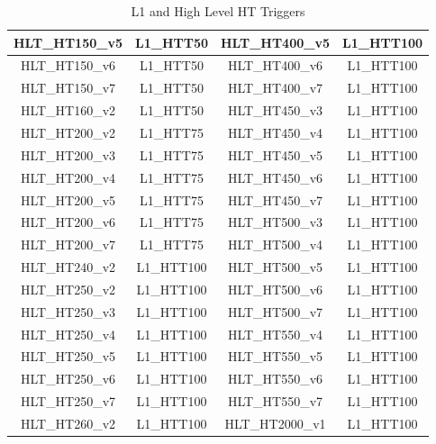 \begin{table}[th]
\begin{tabular}{|c|c||c|c|}
    \hline
    HLT\_HT150\_v5   & L1\_HTT50         & HLT\_HT400\_v5  & L1\_HTT100      \\
    \hline
    HLT\_HT150\_v6   & L1\_HTT50         & HLT\_HT400\_v6  & L1\_HTT100      \\
    \hline
    HLT\_HT150\_v7   & L1\_HTT50         & HLT\_HT400\_v7  & L1\_HTT100      \\
    \hline
    HLT\_HT160\_v2   & L1\_HTT50         & HLT\_HT450\_v3  & L1\_HTT100      \\
    \hline
    HLT\_HT200\_v2   & L1\_HTT75         & HLT\_HT450\_v4  & L1\_HTT100      \\
    \hline
    HLT\_HT200\_v3   & L1\_HTT75         & HLT\_HT450\_v5  & L1\_HTT100      \\
    \hline
    HLT\_HT200\_v4   & L1\_HTT75         & HLT\_HT450\_v6  & L1\_HTT100      \\
    \hline
    HLT\_HT200\_v5   & L1\_HTT75         & HLT\_HT450\_v7  & L1\_HTT100      \\
    \hline
    HLT\_HT200\_v6   & L1\_HTT75         & HLT\_HT500\_v3  & L1\_HTT100      \\
    \hline
    HLT\_HT200\_v7   & L1\_HTT75         & HLT\_HT500\_v4  & L1\_HTT100      \\
    \hline
    HLT\_HT240\_v2   & L1\_HTT100        & HLT\_HT500\_v5  & L1\_HTT100      \\
    \hline
    HLT\_HT250\_v2   & L1\_HTT100        & HLT\_HT500\_v6  & L1\_HTT100      \\
    \hline
    HLT\_HT250\_v3   & L1\_HTT100        & HLT\_HT500\_v7  & L1\_HTT100      \\
    \hline
    HLT\_HT250\_v4   & L1\_HTT100        & HLT\_HT550\_v4  & L1\_HTT100      \\
    \hline
    HLT\_HT250\_v5   & L1\_HTT100        & HLT\_HT550\_v5  & L1\_HTT100      \\
    \hline
    HLT\_HT250\_v6   & L1\_HTT100        & HLT\_HT550\_v6  & L1\_HTT100      \\
    \hline
    HLT\_HT250\_v7   & L1\_HTT100        & HLT\_HT550\_v7  & L1\_HTT100      \\
    \hline
    HLT\_HT260\_v2   & L1\_HTT100        & HLT\_HT2000\_v1 & L1\_HTT100      \\
    \hline

  \end{tabular}
  \caption{L1 and High Level HT Triggers}
  \label{table:HLTdescriptions_HT}
\end{table}

